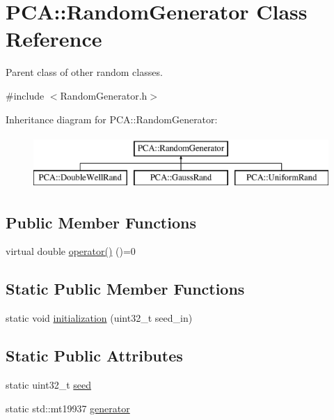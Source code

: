 \hypertarget{class_p_c_a_1_1_random_generator}{}\section{P\+CA\+:\+:Random\+Generator Class Reference}
\label{class_p_c_a_1_1_random_generator}


Parent class of other random classes.  




{\ttfamily \#include $<$Random\+Generator.\+h$>$}

Inheritance diagram for P\+CA\+:\+:Random\+Generator\+:\begin{figure}[H]
\begin{center}
\leavevmode
\includegraphics[height=2.000000cm]{class_p_c_a_1_1_random_generator}
\end{center}
\end{figure}
\subsection*{Public Member Functions}
\begin{DoxyCompactItemize}
\item 
virtual double \hyperlink{class_p_c_a_1_1_random_generator_a4361e39397900ae1e7b2cfa91a592509}{operator()} ()=0
\end{DoxyCompactItemize}
\subsection*{Static Public Member Functions}
\begin{DoxyCompactItemize}
\item 
static void \hyperlink{class_p_c_a_1_1_random_generator_aa2ea4616dd82da5cf66b8232697ecba8}{initialization} (uint32\+\_\+t seed\+\_\+in)
\end{DoxyCompactItemize}
\subsection*{Static Public Attributes}
\begin{DoxyCompactItemize}
\item 
static uint32\+\_\+t \hyperlink{class_p_c_a_1_1_random_generator_af96d99ba4eaf71b7d33afd2fbdb7c30d}{seed}
\item 
static std\+::mt19937 \hyperlink{class_p_c_a_1_1_random_generator_abfbe847dad295b691364d0197283afb7}{generator}
\end{DoxyCompactItemize}
